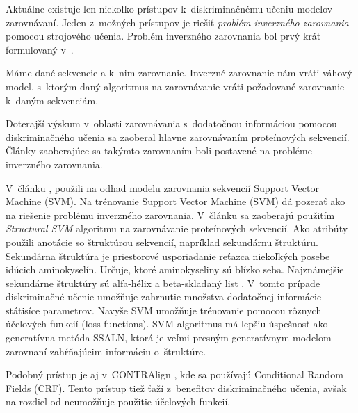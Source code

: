 


Aktuálne existuje len niekoľko prístupov k~diskriminačnému učeniu modelov zarovnávaní.
Jeden z~možných prístupov je riešiť \textit{problém inverzného zarovnania} pomocou strojového učenia. \cite{svmTrainingProteinsAlignment}
Problém inverzného zarovnania bol prvý krát formulovaný v~\cite{inverseAlign1}.
\begin{df}
\label{def:inv-aln}
Máme dané sekvencie a k~nim zarovnanie. Inverzné zarovnanie nám vráti váhový model, s~ktorým daný algoritmus na zarovnávanie vráti požadované zarovnanie k~daným sekvenciám.
\end{df}

Doterajší výskum v~oblasti zarovnávania s~dodatočnou informáciou pomocou diskriminačného učenia sa zaoberal hlavne zarovnávaním proteínových sekvencií. Články zaoberajúce sa takýmto zarovnaním boli postavené na probléme inverzného zarovnania.

V~článku \cite{svmTrainingProteinsAlignment},
použili na odhad modelu zarovnania sekvencií Support Vector Machine (SVM).
Na trénovanie Support Vector Machine (SVM) dá pozerať ako na riešenie problému inverzného zarovnania. V~článku sa zaoberajú použitím \textit{Structural SVM} algoritmu na zarovnávanie proteínových sekvencií. Ako atribúty použili anotácie so štruktúrou sekvencií, napríklad sekundárnu štruktúru.
Sekundárna štruktúra je priestorové usporiadanie reťazca niekoľkých posebe idúcich aminokyselín. Určuje, ktoré aminokyseliny sú blízko seba. Najznámejšie sekundárne štruktúry sú alfa-hélix a beta-skladaný list \cite{wiki:bielkovina}.
V~tomto prípade diskriminačné učenie umožňuje zahrnutie množstva dodatočnej informácie -- státisíce parametrov.
Navyše SVM umožňuje trénovanie pomocou rôznych účelových funkcií (loss functions).
SVM algoritmus má lepšiu úspešnosť ako generatívna metóda SSALN, ktorá je veľmi presným generatívnym modelom zarovnaní zahŕňajúcim informáciu o~štruktúre.

Podobný prístup je aj v~CONTRAlign \cite{contralign}, kde sa používajú Conditional Random Fields (CRF). Tento prístup tiež ťaží z~benefitov diskriminačného učenia, avšak na rozdiel od \cite{svmTrainingProteinsAlignment} neumožňuje použitie účelových funkcií.
